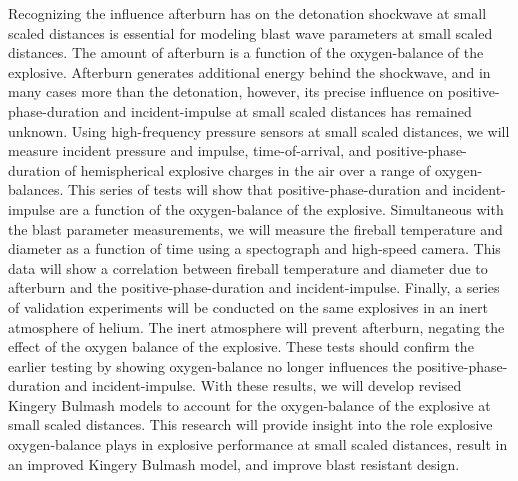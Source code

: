 \documentclass[times,12pt,titlepage]{mstthesis}
\begin{document}
\begin{ThesisAbstract}
Recognizing the influence afterburn has on the detonation shockwave at small scaled distances is essential for modeling blast wave parameters at small scaled distances.  The amount of afterburn is a function of the oxygen-balance of the explosive.  Afterburn generates additional energy behind the shockwave, and in many cases more than the detonation, however, its precise influence on positive-phase-duration and incident-impulse at small scaled distances has remained unknown.  Using high-frequency pressure sensors at small scaled distances, we will measure incident pressure and impulse, time-of-arrival, and positive-phase-duration of hemispherical explosive charges in the air over a range of oxygen-balances. This series of tests will show that positive-phase-duration and incident-impulse are a function of the oxygen-balance of the explosive. Simultaneous with the blast parameter measurements, we will measure the fireball temperature and diameter as a function of time using a spectograph and high-speed camera.  This data will show a correlation between fireball temperature and diameter due to afterburn and the positive-phase-duration and incident-impulse.  Finally, a series of validation experiments will be conducted on the same explosives in an inert atmosphere of helium.  The inert atmosphere will prevent afterburn, negating the effect of the oxygen balance of the explosive.  These tests should confirm the earlier testing by showing oxygen-balance no longer influences the positive-phase-duration and incident-impulse.  With these results, we will develop revised Kingery Bulmash models to account for the oxygen-balance of the explosive at small scaled distances.   This research will provide insight into the role explosive oxygen-balance plays in explosive performance at small scaled distances, result in an improved Kingery Bulmash model, and improve blast resistant design.
\end{ThesisAbstract}


\begin{ThesisFrontMatter}
\tableofcontents
\listoffigures
\listoftables
\listofsymbols
\end{ThesisFrontMatter}
\end{document}
